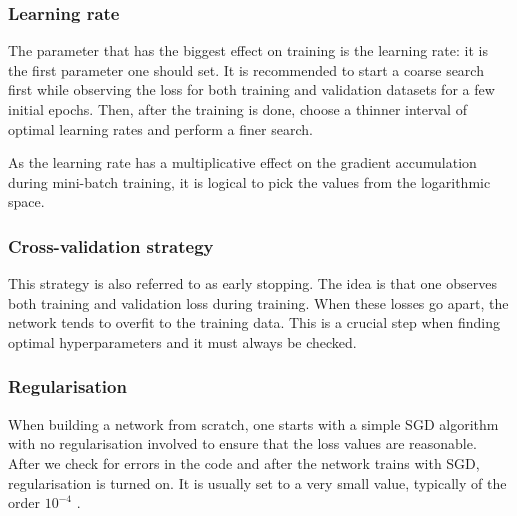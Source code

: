 \subsubsection{Learning rate}

The parameter that has the biggest effect on training is the learning rate: it is the first parameter one should set. It is recommended to start a coarse search first while observing the loss for both training and validation datasets for a few initial epochs. Then, after the training is done, choose a thinner interval of optimal learning rates and perform a finer search. \cite{stanford-L6}

As the learning rate has a multiplicative effect on the gradient accumulation during mini-batch training, it is logical to pick the values from the logarithmic space. \cite{stanford-L6}

\subsubsection{Cross-validation strategy}

This strategy is also referred to as early stopping. The idea is that one observes both training and validation loss during training. When these losses go apart, the network tends to overfit to the training data. This is a crucial step when finding optimal hyperparameters and it must always be checked. \cite{stanford-github}

\subsubsection{Regularisation}

When building a network from scratch, one starts with a simple SGD algorithm with no regularisation involved to ensure that the loss values are reasonable. After we check for errors in the code and after the network trains with SGD, regularisation is turned on. It is usually set to a very small value, typically of the order $ 10^{-4} $ \cite{stanford-L6}.




